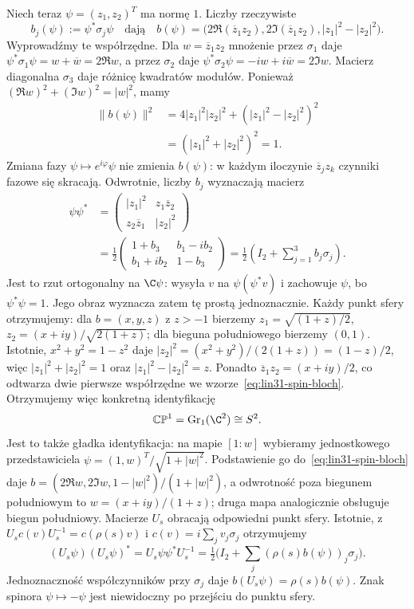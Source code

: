 \begin{przyklad}
Niech teraz $\psi=(z_1,z_2)^T$ ma normę $1$.
Liczby rzeczywiste
\begin{equation}\label{eq:lin31-spin-bloch}
 b_j(\psi):=\psi^*\sigma_j\psi
 \quad\text{dają}\quad
 b(\psi)=
 \bigl(2\Re(\overline z_1z_2),
       2\Im(\overline z_1z_2),
       |z_1|^2-|z_2|^2\bigr).
\end{equation}
Wyprowadźmy te współrzędne. Dla $w=\overline z_1z_2$
mnożenie przez $\sigma_1$ daje
$\psi^*\sigma_1\psi=w+\overline w=2\Re w$,
a przez $\sigma_2$ daje
$\psi^*\sigma_2\psi=-iw+i\overline w=2\Im w$.
Macierz diagonalna $\sigma_3$ daje różnicę kwadratów modułów.
Ponieważ $(\Re w)^2+(\Im w)^2=|w|^2$, mamy
\[
 \begin{aligned}
 \|b(\psi)\|^2
 &=4|z_1|^2|z_2|^2+(|z_1|^2-|z_2|^2)^2\\
 &=(|z_1|^2+|z_2|^2)^2=1.
 \end{aligned}
\]
Zmiana fazy $\psi\mapsto e^{i\varphi}\psi$
nie zmienia $b(\psi)$: w każdym iloczynie
$\overline z_jz_k$ czynniki fazowe się skracają.
Odwrotnie, liczby $b_j$ wyznaczają macierz
\[
 \begin{aligned}
 \psi\psi^*
 &=\begin{pmatrix}
 |z_1|^2&z_1\overline z_2\\
 z_2\overline z_1&|z_2|^2
 \end{pmatrix}\\
 &=\frac12\begin{pmatrix}
 1+b_3&b_1-ib_2\\b_1+ib_2&1-b_3
 \end{pmatrix}
 =\frac12\left(I_2+\sum_{j=1}^3b_j\sigma_j\right).
 \end{aligned}
\]
Jest to rzut ortogonalny na $\C\psi$: wysyła $v$ na
$\psi(\psi^*v)$ i zachowuje $\psi$, bo $\psi^*\psi=1$.
Jego obraz wyznacza zatem tę prostą jednoznacznie.
Każdy punkt sfery otrzymujemy: dla
$b=(x,y,z)$ z $z>-1$ bierzemy
$z_1=\sqrt{(1+z)/2}$,
$z_2=(x+iy)/\sqrt{2(1+z)}$;
dla bieguna południowego bierzemy $(0,1)$.
Istotnie, $x^2+y^2=1-z^2$ daje
$|z_2|^2=(x^2+y^2)/(2(1+z))=(1-z)/2$,
więc $|z_1|^2+|z_2|^2=1$ oraz $|z_1|^2-|z_2|^2=z$.
Ponadto $\overline z_1z_2=(x+iy)/2$,
co odtwarza dwie pierwsze współrzędne we wzorze~\eqref{eq:lin31-spin-bloch}.
Otrzymujemy więc konkretną identyfikację
\[
 \mathbb{CP}^1=\operatorname{Gr}_1(\C^2)\cong S^2.
\]
Jest to także gładka identyfikacja: na mapie $[1:w]$
wybieramy jednostkowego przedstawiciela
$\psi=(1,w)^T/\sqrt{1+|w|^2}$.
Podstawienie go do~\eqref{eq:lin31-spin-bloch} daje
$b=(2\Re w,2\Im w,1-|w|^2)/(1+|w|^2)$,
a odwrotność poza biegunem południowym to $w=(x+iy)/(1+z)$;
druga mapa analogicznie obsługuje biegun południowy.
Macierze $U_s$ obracają odpowiedni punkt sfery.
Istotnie, z $U_sc(v)U_s^{-1}=c(\rho(s)v)$ i $c(v)=i\sum_jv_j\sigma_j$
otrzymujemy
\[
 (U_s\psi)(U_s\psi)^*
 =U_s\psi\psi^*U_s^{-1}
 =\tfrac12\bigl(I_2+\textstyle\sum_j(\rho(s)b(\psi))_j\sigma_j\bigr).
\]
Jednoznaczność współczynników przy $\sigma_j$ daje
$b(U_s\psi)=\rho(s)b(\psi)$.
Znak spinora $\psi\mapsto-\psi$ jest
niewidoczny po przejściu do punktu sfery.
\end{przyklad}

